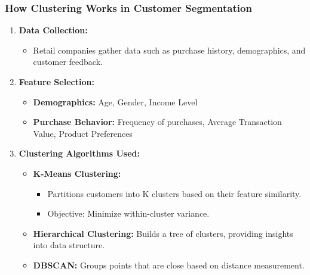 \documentclass[aspectratio=169]{beamer}
\begin{document}
\begin{frame}[fragile]
    \frametitle{How Clustering Works in Customer Segmentation}
    
    \begin{enumerate}
        \item \textbf{Data Collection:}
              \begin{itemize}
                  \item Retail companies gather data such as purchase history, demographics, and customer feedback.
              \end{itemize}
        
        \item \textbf{Feature Selection:}
              \begin{itemize}
                  \item \textbf{Demographics:} Age, Gender, Income Level
                  \item \textbf{Purchase Behavior:} Frequency of purchases, Average Transaction Value, Product Preferences
              \end{itemize}
        
        \item \textbf{Clustering Algorithms Used:}
              \begin{itemize}
                  \item \textbf{K-Means Clustering:} 
                        \begin{itemize}
                            \item Partitions customers into K clusters based on their feature similarity.
                            \item Objective: Minimize within-cluster variance.
                        \end{itemize}
                  \item \textbf{Hierarchical Clustering:} Builds a tree of clusters, providing insights into data structure.
                  \item \textbf{DBSCAN:} Groups points that are close based on distance measurement.
              \end{itemize}
    \end{enumerate}
\end{frame}
\end{document}
